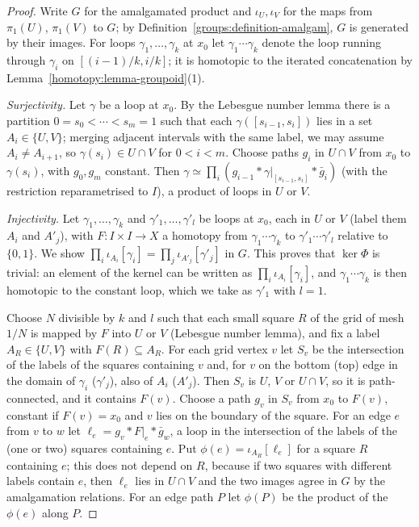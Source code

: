 \begin{proof}
Write $G$ for the amalgamated product and $\iota_U, \iota_V$ for the maps from $\pi_1(U)$, $\pi_1(V)$ to $G$; by Definition~\ref{groups:definition-amalgam}, $G$ is
generated by their images. For loops $\gamma_1, \ldots, \gamma_k$ at $x_0$ let $\gamma_1 \cdots \gamma_k$ denote the loop running through $\gamma_i$ on
$[(i-1)/k, i/k]$; it is homotopic to the iterated concatenation by Lemma~\ref{homotopy:lemma-groupoid}(1).

\emph{Surjectivity.} Let $\gamma$ be a loop at $x_0$. By the Lebesgue number lemma there is a partition $0 = s_0 < \cdots < s_m = 1$ such that each
$\gamma([s_{i-1}, s_i])$ lies in a set $A_i \in \{U, V\}$; merging adjacent intervals with the same label, we may assume $A_i \neq A_{i+1}$, so
$\gamma(s_i) \in U \cap V$ for $0 < i < m$. Choose paths $g_i$ in $U \cap V$ from $x_0$ to $\gamma(s_i)$, with $g_0, g_m$ constant. Then
$\gamma \simeq \prod_i (g_{i-1} * \gamma|_{[s_{i-1}, s_i]} * \bar g_i)$ (with the restriction reparametrised to $I$), a product of loops in $U$ or $V$.

\emph{Injectivity.} Let $\gamma_1, \ldots, \gamma_k$ and $\gamma'_1, \ldots, \gamma'_l$ be loops at $x_0$, each in $U$ or $V$ (label them $A_i$ and $A'_j$), with
$F \colon I \times I \to X$ a homotopy from $\gamma_1 \cdots \gamma_k$ to $\gamma'_1 \cdots \gamma'_l$ relative to $\{0, 1\}$. We show
$\prod_i \iota_{A_i}[\gamma_i] = \prod_j \iota_{A'_j}[\gamma'_j]$ in $G$. This proves that $\ker \Phi$ is trivial: an element of the kernel can be written as
$\prod_i \iota_{A_i}[\gamma_i]$, and $\gamma_1 \cdots \gamma_k$ is then homotopic to the constant loop, which we take as $\gamma'_1$ with $l = 1$.

Choose $N$ divisible by $k$ and $l$ such that each small square $R$ of the grid of mesh $1/N$ is mapped by $F$ into $U$ or $V$ (Lebesgue number lemma), and fix
a label $A_R \in \{U, V\}$ with $F(R) \subseteq A_R$. For each grid vertex $v$ let $S_v$ be the intersection of the labels of the squares containing $v$ and, for
$v$ on the bottom (top) edge in the domain of $\gamma_i$ ($\gamma'_j$), also of $A_i$ ($A'_j$). Then $S_v$ is $U$, $V$ or $U \cap V$, so it is path-connected, and
it contains $F(v)$. Choose a path $g_v$ in $S_v$ from $x_0$ to $F(v)$, constant if $F(v) = x_0$ and $v$ lies on the boundary of the square. For an edge $e$
from $v$ to $w$ let $\ell_e = g_v * F|_e * \bar g_w$, a loop in the intersection of the labels of the (one or two) squares containing $e$. Put
$\phi(e) = \iota_{A_R}[\ell_e]$ for a square $R$ containing $e$; this does not depend on $R$, because if two squares with different labels contain $e$, then
$\ell_e$ lies in $U \cap V$ and the two images agree in $G$ by the amalgamation relations. For an edge path $P$ let $\phi(P)$ be the product of the $\phi(e)$ along $P$.


\end{proof}
